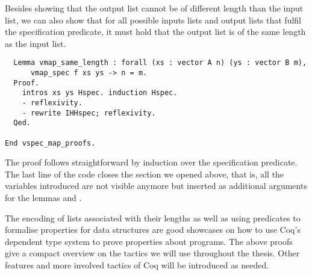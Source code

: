 Besides showing that the output list cannot be of different length than the input list, we can also show that for all possible inputs lists  and output lists  that fulfil the specification predicate, it must hold that the output list is of the same length as the input list.

\begin{verbatim}
  Lemma vmap_same_length : forall (xs : vector A n) (ys : vector B m),
      vmap_spec f xs ys -> n = m.
  Proof.
    intros xs ys Hspec. induction Hspec.
    - reflexivity.
    - rewrite IHHspec; reflexivity.
  Qed.

End vspec_map_proofs.
\end{verbatim}

The proof follows straightforward by induction over the specification predicate.
The last line of the code closes the section we opened above, that is, all the variables introduced are not visible anymore but inserted as additional arguments for the lemmas  and .

The encoding of lists associated with their lengths as well as using predicates to formalise properties for data structures are good showcases on how to use Coq's dependent type system to prove properties about programs.
The above proofs give a compact overview on the tactics we will use throughout the thesis.
Other features and more involved tactics of Coq will be introduced as needed.

%
%



